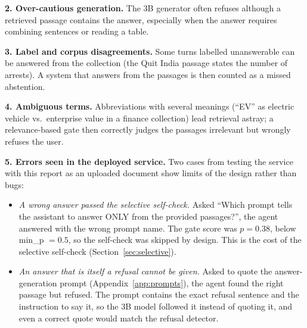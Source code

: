 \documentclass[11pt,a4paper]{report}
\begin{document}
\textbf{2. Over-cautious generation.} The 3B generator often refuses although a retrieved passage contains the answer, especially when the answer requires combining sentences or reading a table.

\textbf{3. Label and corpus disagreements.} Some turns labelled unanswerable can be answered from the collection (the Quit India passage states the number of arrests). A system that answers from the passages is then counted as a missed abstention.

\textbf{4. Ambiguous terms.} Abbreviations with several meanings (``EV'' as electric vehicle vs.\ enterprise value in a finance collection) lead retrieval astray; a relevance-based gate then correctly judges the passages irrelevant but wrongly refuses the user.

\textbf{5. Errors seen in the deployed service.} Two cases from testing the service with this report as an uploaded document show limits of the design rather than bugs:
\begin{itemize}
\item \emph{A wrong answer passed the selective self-check.} Asked ``Which prompt tells the assistant to answer ONLY from the provided passages?'', the agent answered with the wrong prompt name. The gate score was $p = 0.38$, below min\_p $= 0.5$, so the self-check was skipped by design. This is the cost of the selective self-check (Section~\ref{sec:selective}).
\item \emph{An answer that is itself a refusal cannot be given.} Asked to quote the answer-generation prompt (Appendix~\ref{app:prompts}), the agent found the right passage but refused. The prompt contains the exact refusal sentence and the instruction to say it, so the 3B model followed it instead of quoting it, and even a correct quote would match the refusal detector.
\end{itemize}

\end{document}
